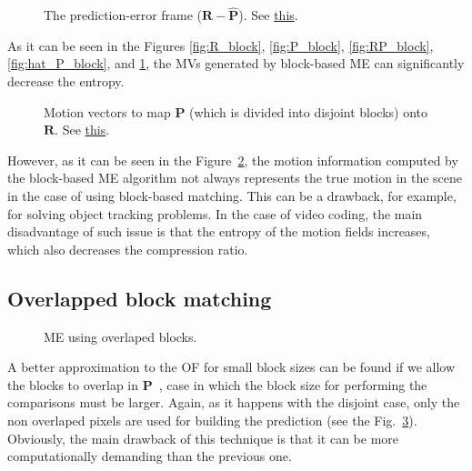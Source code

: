 \begin{figure}
  \centering
  \caption{The prediction-error frame
    (${\mathbf R} - {\hat{\mathbf P}}$). See
    \href{https://github.com/Sistemas-Multimedia/Sistemas-Multimedia.github.io/blob/master/milestones/09-ME/full_search_block_ME.ipynb}{this}.}
  \label{fig:error_block}
\end{figure}

As it can be seen in the Figures \ref{fig:R_block}, \ref{fig:P_block},
\ref{fig:RP_block}, \ref{fig:hat_P_block}, and \ref{fig:error_block}, the MVs generated
by block-based ME can significantly decrease the entropy.

\begin{figure}
  \centering
  \caption{Motion vectors to map ${\mathbf P}$ (which is divided into
    disjoint blocks) onto ${\mathbf R}$. See
    \href{https://github.com/Sistemas-Multimedia/Sistemas-Multimedia.github.io/blob/master/milestones/09-ME/full_search_block_ME.ipynb}{this}.}
  \label{fig:MVs_block}
\end{figure}

However, as it can be seen in the Figure~\ref{fig:MVs_block}, the
motion information computed by the block-based ME algorithm not always
represents the true motion in the scene in the case of using
block-based matching. This can be a drawback, for example, for solving
object tracking problems. In the case of video coding, the main
disadvantage of such issue is that the entropy of the motion fields
increases, which also decreases the compression ratio.

\subsection{Overlapped block matching}

\begin{figure}
  \centering
  \caption{ME using overlaped blocks.}
  \label{fig:overlaped}
\end{figure}

A better approximation to the OF for small block sizes can be found if
we allow the blocks to overlap in ${\mathbf
  P}$~\cite{orchard1994overlapped}, case in which the block size for
performing the comparisons must be larger. Again, as it happens with
the disjoint case, only the non overlaped pixels are used for building
the prediction (see the Fig.~\ref{fig:overlaped}). Obviously, the main
drawback of this technique is that it can be more computationally
demanding than the previous one.

